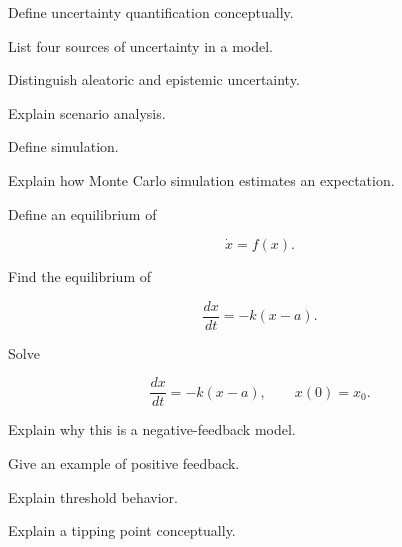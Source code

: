 \begin{exercise}[2]
Define uncertainty quantification conceptually.
\end{exercise}

\begin{exercise}[3]
List four sources of uncertainty in a model.
\end{exercise}

\begin{exercise}[3]
Distinguish aleatoric and epistemic uncertainty.
\end{exercise}

\begin{exercise}[2]
Explain scenario analysis.
\end{exercise}

\begin{exercise}[2]
Define simulation.
\end{exercise}

\begin{exercise}[3]
Explain how Monte Carlo simulation estimates an expectation.
\end{exercise}

\begin{exercise}[2]
Define an equilibrium of

\[
\dot{x}=f(x).
\]
\end{exercise}

\begin{exercise}[3]
Find the equilibrium of

\[
\frac{dx}{dt}
=
-k(x-a).
\]
\end{exercise}

\begin{exercise}[3]
Solve

\[
\frac{dx}{dt}
=
-k(x-a),
\qquad
x(0)=x_0.
\]
\end{exercise}

\begin{exercise}[3]
Explain why this is a negative-feedback model.
\end{exercise}

\begin{exercise}[3]
Give an example of positive feedback.
\end{exercise}

\begin{exercise}[3]
Explain threshold behavior.
\end{exercise}

\begin{exercise}[3]
Explain a tipping point conceptually.
\end{exercise}

